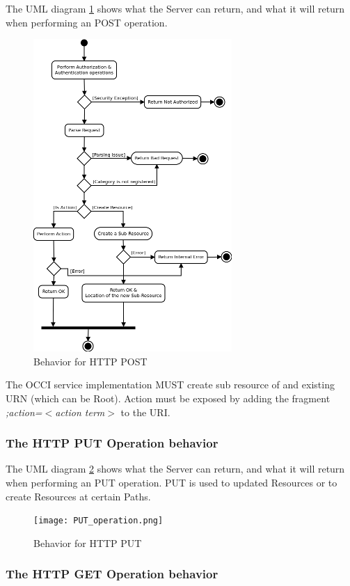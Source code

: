 \documentclass[10pt,a4paper]{article}
\begin{document}
The UML diagram \ref{fig:post_operation} shows what the Server can return, and what it will return when performing an POST operation.

\clearpage
\begin{figure}[!h]
	\centering
	\includegraphics[scale=0.4]{POST_operation.png}
	\caption{Behavior for HTTP POST}
	\label{fig:post_operation}
\end{figure}

The OCCI service implementation MUST create sub resource of and existing URN (which can be Root). Action must be exposed by adding the fragment \emph{;action=$<$action term$>$} to the URI.

\subsubsection{The HTTP PUT Operation behavior}

The UML diagram \ref{fig:put_operation} shows what the Server can return, and what it will return when performing an PUT operation. PUT is used to updated Resources or to create Resources at certain Paths.

\clearpage
\begin{figure}[!h]
	\centering
	\texttt{[image: PUT\_operation.png]}
	\caption{Behavior for HTTP PUT}
	\label{fig:put_operation}
\end{figure}

\subsubsection{The HTTP GET Operation behavior}
\end{document}
